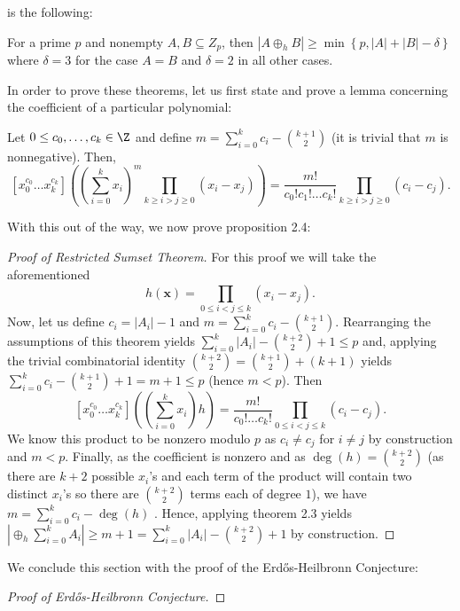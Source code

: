 		is the following: \begin{theorem}
			For a prime $p$ and nonempty $A,B \subseteq Z_{p}$,
			then $\left| A \oplus_{h} B \right| \ge \min \left\{ p,
			\left| A \right|  + \left| B \right|  - \delta \right\}
			$ where $\delta = 3$ for  the case $A = B$ and $\delta
			= 2$ in all other cases.  \end{theorem} In order to
			prove these theorems, let us first state and prove a
			lemma concerning the coefficient of a particular
			polynomial: \begin{lemma}[] Let $0 \le c_0, \ldots,
				c_{k} \in \Z$ and define $m = \sum_{i=0}^{k}
				c_{i} - \binom{k+1}{2}$ (it is trivial that $m$
				is nonnegative). Then,\[[x_0^{c_0}\ldots
				x_{k}^{c_{k}}] \left( \left( \sum_{i=0}^{k}
			x_{i} \right) ^{m} \prod_{k \ge i > j \ge 0}^{} \left(
x_{i} - x_{j} \right)  \right) = \frac{m!}{c_0! c_1! \ldots c_{k}!} \prod_{k
\ge i > j \ge 0}^{} \left( c_{i} - c_{j} \right).\] \end{lemma}  With this out of the way,
we now prove proposition 2.4: \begin{proof}[Proof of Restricted Sumset Theorem]
	For this proof we will take the aforementioned \[ h\left( \textbf{x}
		\right) = \prod_{0\le i < j \le k}^{} \left( x_{i} - x_{j}
	\right) .\] Now, let us define $c_{i} = \left| A_{i} \right|  -1$ and
	$m = \sum_{i=0}^{k} c_{i} - \binom{k+1}{2}$. Rearranging the
	assumptions of this theorem yields $\sum_{i=0}^{k} \left| A_{i} \right|
	- \binom{k+2}{2} + 1 \le p$ and, applying the trivial combinatorial
	identity $\binom{k+2}{2} =  \binom{k+1}{2} +  (k+1)$ yields \\
	$\sum_{i=0}^{k} c_{i} - \binom{k+1}{2} + 1 = m + 1 \le p$ (hence $m <
	p$). Then  \[ [x_0^{c_0}\ldots x_{k}^{c_{k}}]\left( \left(
	\sum_{i=0}^{k} x_{i} \right) h \right) =  \frac{m!}{c_0! \ldots
	c_{k}!}\prod_{0 \le i < j \le k}^{} \left( c_{i} - c_{j} \right) .\] We
	know this product to be nonzero modulo  $p$ as  $c_{i} \neq c_{j}$  for
	$i \neq j$ by construction and $m < p$. Finally, as the coefficient is
	nonzero and as $\deg \left( h \right) =  \binom{k+2}{2}$ (as there are
	$k+2$ possible $x_{i}$'s and each term of the product will contain two
	distinct $x_{i}$'s so there are $\binom{k+2}{2}$ terms each of degree
	$1$), we have $m = \sum_{i=0}^{k} c_{i} - \deg \left( h \right)$
	. Hence, applying theorem 2.3 yields  $\left|
	\oplus _h \sum_{i= 0}^{k}  A_i \right| \ge m + 1 = \sum_{i=0}^{k}
	\left| A_{i} \right| - \binom{k+2}{2}+1$ by construction.  \end{proof}
We conclude this section with the proof of the Erdős-Heilbronn Conjecture:
\begin{proof}[Proof of Erdős-Heilbronn Conjecture]
\end{proof}
